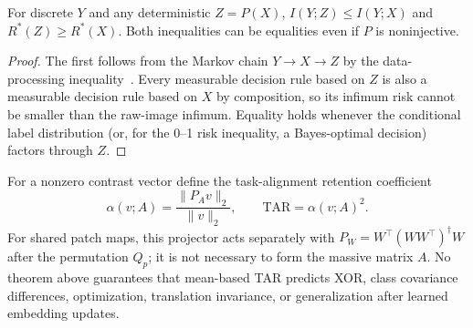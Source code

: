 \begin{proposition}\label{prop:dpi}
For discrete $Y$ and any deterministic $Z=P(X)$, $I(Y;Z)\le I(Y;X)$ and $R^*(Z)\ge R^*(X)$. Both inequalities can be equalities even if $P$ is noninjective.
\end{proposition}
\begin{proof}
The first follows from the Markov chain $Y\to X\to Z$ by the data-processing inequality~\citep{coverthomas2006}. Every measurable decision rule based on $Z$ is also a measurable decision rule based on $X$ by composition, so its infimum risk cannot be smaller than the raw-image infimum. Equality holds whenever the conditional label distribution (or, for the 0--1 risk inequality, a Bayes-optimal decision) factors through $Z$.
\end{proof}
For a nonzero contrast vector define the task-alignment retention coefficient
\begin{equation}\label{eq:tar}
 \alpha(v;A)=\frac{\|P_Av\|_2}{\|v\|_2},\qquad \mathrm{TAR}=\alpha(v;A)^2.
\end{equation}
For shared patch maps, this projector acts separately with $P_W=W^\top(WW^\top)^\dagger W$ after the permutation $Q_p$; it is not necessary to form the massive matrix $A$. No theorem above guarantees that mean-based TAR predicts XOR, class covariance differences, optimization, translation invariance, or generalization after learned embedding updates.
